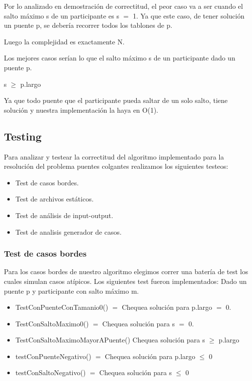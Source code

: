 Por lo analizado en demostraci\'on de correctitud, el peor caso va a ser cuando el salto m\'aximo s de un participante es s $=$ 1. Ya que este caso, de tener soluci\'on un puente p, se deber\'ia recorrer todos los tablones de p.

Luego la complejidad es exactamente N.

Los mejores casos ser\'ian lo que el salto m\'aximo s de un participante dado un puente p.

s $\geq$ p.largo

Ya que todo puente que el participante pueda saltar de un solo salto, tiene soluci\'on y nuestra implementaci\'on la haya en O(1).

\newpage

 
\subsection{Testing}

Para analizar y testear la correctitud del algoritmo implementado para la resoluci\'on del problema puentes colgantes realizamos los siguientes testeos:

\begin{itemize}
  \item Test de casos bordes.
  \item Test de archivos est\'aticos.
  \item Test de an\'alisis de input-output.
  \item Test de analisis generador de casos.
\end{itemize}

\subsubsection{Test de casos bordes}

Para los casos bordes de nuestro algoritmo elegimos correr una bater\'ia de test los cuales simulan casos at\'ipicos.
Los siguientes test fueron implementados:
Dado un puente p y participante con salto m\'aximo m.

\begin{itemize}
  \item TestConPuenteConTamanio0() $=$ Chequea soluci\'on para p.largo $=$ 0.
  \item 	TestConSaltoMaximo0() $=$ Chequea soluci\'on para s $=$ 0.
  \item TestConSaltoMaximoMayorAPuente() Chequea soluci\'on para s $\geq$ p.largo 
  \item testConPuenteNegativo() $=$ Chequea soluci\'on para p.largo $\leq$ 0
  \item testConSaltoNegativo() $=$ Chequea soluci\'on para s $\leq$ 0
\end{itemize}


